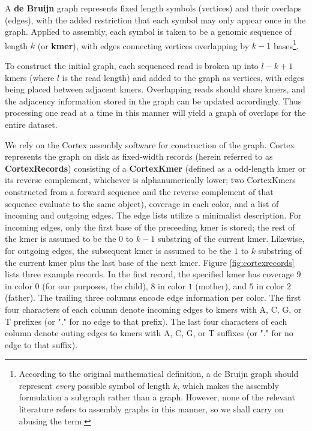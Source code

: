 A \textbf{de Bruijn} graph represents fixed length symbols (vertices) and their overlaps (edges), with the added restriction that each symbol may only appear once in the graph\cite{Bruijn:1946va}.  Applied to assembly, each symbol is taken to be a genomic sequence of length $k$ (or \textbf{kmer}), with edges connecting vertices overlapping by $k-1$ bases\footnote{According to the original mathematical definition, a de Bruijn graph should represent \textit{every} possible symbol of length $k$, which makes the assembly formulation a subgraph rather than a graph.  However, none of the relevant literature refers to assembly graphs in this manner, so we shall carry on abusing the term.}.

To construct the initial graph, each sequenced read is broken up into $l-k+1$ kmers (where $l$ is the read length) and added to the graph as vertices, with edges being placed between adjacent kmers.  Overlapping reads should share kmers, and the adjacency information stored in the graph can be updated accordingly.  Thus processing one read at a time in this manner will yield a graph of overlaps for the entire dataset.

We rely on the Cortex assembly software for construction of the graph.  Cortex represents the graph on disk as fixed-width records (herein referred to as \textbf{CortexRecords}) consisting of a \textbf{CortexKmer} (defined as a odd-length kmer or its reverse complement, whichever is alphanumerically lower; two CortexKmers constructed from a forward sequence and the reverse complement of that sequence evaluate to the same object), coverage in each color, and a list of incoming and outgoing edges.  The edge lists utilize a minimalist description.  For incoming edges, only the first base of the preceeding kmer is stored; the rest of the kmer is assumed to be the $0$ to $k-1$ substring of the current kmer.  Likewise, for outgoing edges, the subsequent kmer is assumed to be the $1$ to $k$ substring of the current kmer plus the last base of the next kmer.  Figure \ref{fig:cortexrecords} lists three example records.  In the first record, the specified kmer has coverage $9$ in color $0$ (for our purposes, the child), $8$ in color $1$ (mother), and $5$ in color $2$ (father).  The trailing three columns encode edge information per color.  The first four characters of each column denote incoming edges to kmers with A, C, G, or T prefixes (or "." for no edge to that prefix).  The last four characters of each column denote outing edges to kmers with A, C, G, or T suffixes (or "." for no edge to that suffix).

